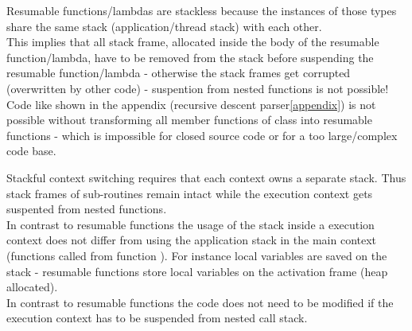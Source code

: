 \label{stackless}
Resumable functions/lambdas are stackless because the instances of those types
share the same stack (application/thread stack) with each other.\\
This implies that all stack frame, allocated inside the body of the resumable
function/lambda, have to be removed from the stack before suspending the
resumable function/lambda - otherwise the stack frames get corrupted
(overwritten by other code) - suspention from nested functions is not possible!\\
Code like shown in the appendix (recursive descent parser\ref{appendix}) is not
possible without transforming all member functions of class  into
resumable functions - which is impossible for closed source code or for a too
large/complex code base.

Stackful context switching requires that each context owns a separate stack.
Thus stack frames of sub-routines remain intact while the execution context gets
suspented from nested functions.\\
In contrast to resumable functions the usage of the stack inside a execution
context does not differ from using the application stack in the main context
(functions called from function \main). For instance local variables are saved
on the stack - resumable functions store local variables on the activation frame
(heap allocated).\\
In contrast to resumable functions the code does not need to be modified if the
execution context has to be suspended from nested call stack.

